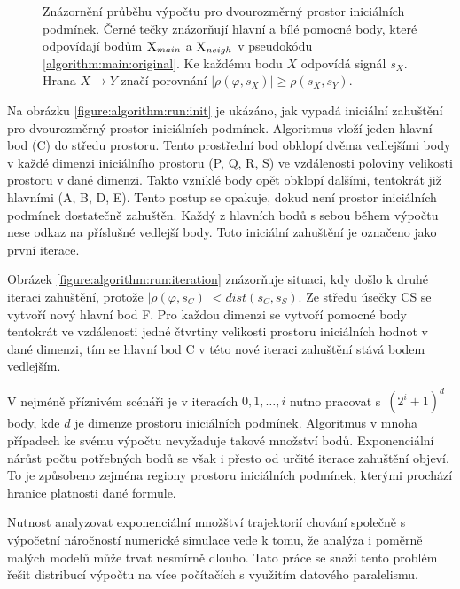 \begin{figure}[H]
\begin{center}
{{
}}
\caption{Znázornění průběhu výpočtu pro dvourozměrný prostor iniciálních podmínek.
Černé tečky znázorňují hlavní a bílé pomocné body, které odpovídají bodům $\textsc{X}_{main}$ a $\textsc{X}_{neigh}$ v pseudokódu \ref{algorithm:main:original}.
Ke každému bodu $X$ odpovídá signál $s_X$. Hrana $X \rightarrow Y$ značí porovnání
$\big|\rho(\varphi, s_X)\big| \geq \rho(s_X, s_Y)$.}
\end{center}
\end{figure}

Na obrázku \ref{figure:algorithm:run:init} je ukázáno, jak vypadá iniciální zahuštění
pro dvourozměrný prostor iniciálních podmínek. Algoritmus vloží jeden hlavní bod (C) do středu prostoru. 
Tento prostřední bod obklopí dvěma vedlejšími body v každé dimenzi iniciálního prostoru (P, Q, R, S) ve vzdálenosti
poloviny velikosti prostoru v dané dimenzi. Takto vzniklé body opět obklopí dalšími, tentokrát již hlavními (A, B, D, E).
Tento postup se opakuje, dokud není prostor iniciálních podmínek dostatečně zahuštěn.
Každý z hlavních bodů s sebou během výpočtu nese odkaz na příslušné vedlejší body.
Toto iniciální zahuštění je označeno jako první iterace.

Obrázek \ref{figure:algorithm:run:iteration} znázorňuje situaci, kdy došlo k druhé iteraci zahuštění,
pro\-tože $\big|\rho(\varphi, s_C)\big| < dist(s_C, s_S)$. Ze středu úsečky CS se vytvoří
nový hlavní bod F. Pro každou dimenzi se vytvoří pomocné body tentokrát ve vzdá\-le\-nosti jedné čtvrtiny
velikosti prostoru iniciálních hodnot v dané dimenzi, tím se hlavní bod C v této
nové iteraci zahuštění stává bodem vedlejším.

V nejméně příznivém scénáři je v iteracích $0, 1, \ldots, i$ nutno pracovat s~$(2^i + 1)^d$ body,
kde $d$ je dimenze prostoru iniciálních podmínek. Algoritmus v mnoha případech
ke svému výpočtu nevyžaduje takové množství bodů. Expo\-nen\-ciál\-ní nárůst počtu
potřebných bodů se však i přesto od určité iterace za\-huš\-tě\-ní objeví. To je způsobeno
zejména regiony prostoru iniciálních podmínek, kterými prochází hranice platnosti dané formule.

Nutnost analyzovat exponenciální množštví trajektorií chování společně s
výpočetní náročností numerické simulace vede k tomu, že analýza i po\-měr\-ně
malých modelů může trvat nesmírně dlouho. Tato práce se snaží tento problém řešit
distribucí výpočtu na více počítačích s využitím datového paralelismu.
